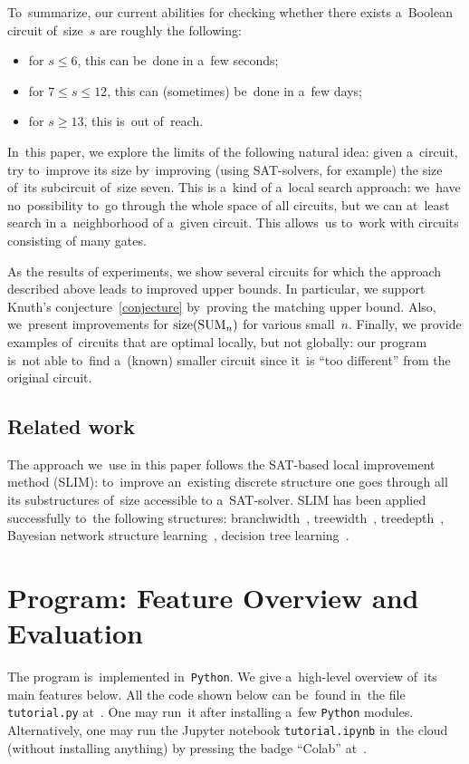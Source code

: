 To~summarize, our current abilities for checking whether there exists a~Boolean circuit of~size~$s$ are roughly the following:
\begin{itemize}
\item for $s \le 6$, this can be~done in a~few seconds;
\item for $7 \le s \le 12$, this can (sometimes)
be~done in a~few days;
\item for $s \ge 13$, this is~out of~reach.
\end{itemize}

In~this paper, we explore the limits of the following natural idea: given a~circuit, try to~improve its size by~improving (using SAT-solvers, for example) the size
of~its subcircuit of~size seven. This is a~kind of a~local search approach: we~have no~possibility to~go through the whole space of all circuits, but we can at~least
search in a~neighborhood of a~given circuit.
This allows~us to~work with circuits consisting
of many gates.

As the results of experiments, we show several circuits
for which the approach described above leads to improved upper bounds. In particular, we support Knuth's conjecture~\eqref{conjecture} by~proving the matching upper bound.
Also, we~present improvements for $\operatorname{size}(\operatorname{SUM}_n)$ for various small~$n$.
Finally, we provide examples of~circuits that are
optimal locally, but not globally: our program 
is~not able to~find a~(known) smaller circuit since
it~is
``too different'' from the original circuit.

\subsection*{Related work}
The approach we~use in this paper follows the SAT-based 
local improvement method (SLIM): to~improve an~existing
discrete structure one goes through all its substructures
of~size accessible to a~SAT-solver. 
SLIM has been applied successfully to~the following 
structures:
branchwidth~\cite{DBLP:journals/tocl/LodhaOS19},
treewidth~\cite{DBLP:conf/sat/FichteLS17},
treedepth~\cite{DBLP:conf/cp/RamaswamyS20},
Bayesian network structure learning~\cite{AAAI1},
decision tree learning~\cite{AAAI2}.

\section{Program: Feature Overview and Evaluation}
The program is~implemented in~\texttt{Python}.
We give a~high-level overview of~its main features below.
All the code shown below
can be~found in~the
file \texttt{tutorial.py} at~\cite{git-improvement}.
One may run~it after installing a~few \texttt{Python} modules. Alternatively, one may run the Jupyter notebook
\texttt{tutorial.ipynb} in~the cloud (without installing
anything) by pressing the badge ``Colab''
at~\cite{git-improvement}.

